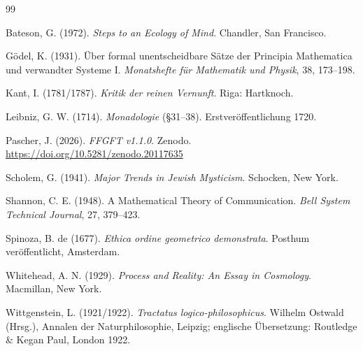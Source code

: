 \begin{thebibliography}{99}

Bateson, G. (1972). \emph{Steps to an Ecology of Mind}. Chandler, San Francisco.

Gödel, K. (1931). Über formal unentscheidbare Sätze der Principia Mathematica und verwandter Systeme I. \emph{Monatshefte für Mathematik und Physik}, 38, 173--198.

Kant, I. (1781/1787). \emph{Kritik der reinen Vernunft}. Riga: Hartknoch.

Leibniz, G. W. (1714). \emph{Monadologie} (§31--38). Erstveröffentlichung 1720.

Pascher, J. (2026). \emph{FFGFT v1.1.0}. Zenodo. \url{https://doi.org/10.5281/zenodo.20117635}

Scholem, G. (1941). \emph{Major Trends in Jewish Mysticism}. Schocken, New York.

Shannon, C. E. (1948). A Mathematical Theory of Communication. \emph{Bell System Technical Journal}, 27, 379--423.

Spinoza, B. de (1677). \emph{Ethica ordine geometrico demonstrata}. Posthum veröffentlicht, Amsterdam.

Whitehead, A. N. (1929). \emph{Process and Reality: An Essay in Cosmology}. Macmillan, New York.

Wittgenstein, L. (1921/1922). \emph{Tractatus logico-philosophicus}. Wilhelm Ostwald (Hrsg.), Annalen der Naturphilosophie, Leipzig; englische Übersetzung: Routledge \& Kegan Paul, London 1922.

\end{thebibliography}
